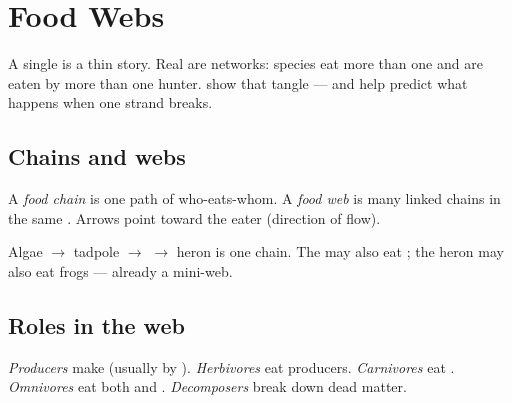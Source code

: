 \chapter{Food Webs}\label{ch:g5:food-webs}

A single  is a thin story. Real  are networks:
species eat more than one  and are eaten by more than one hunter.
 show that tangle --- and help predict what happens when one
strand breaks.

\section{Chains and webs}

\begin{definition}\label{def:g5:food-webs:chain-web}
A \emph{food chain} is one path of who-eats-whom. A
\emph{food web} is many linked chains in the same
. Arrows point toward the eater (direction of  flow).
\end{definition}




\begin{example}\label{ex:g5:food-webs:pond}
Algae $\to$ tadpole $\to$  $\to$ heron is one chain. The  may
also eat ; the heron may also eat frogs --- already a mini-web.
\end{example}

\section{Roles in the web}

\begin{definition}\label{def:g5:food-webs:roles}
\emph{Producers} make  (usually by ).
\emph{Herbivores} eat producers. \emph{Carnivores}
 eat . \emph{Omnivores} eat both
 and . \emph{Decomposers} break down
dead matter.
\end{definition}

